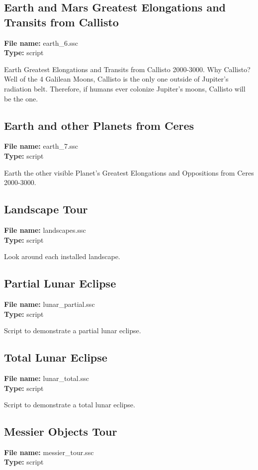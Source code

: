 \subsection{Earth and Mars Greatest Elongations and Transits from Callisto}
\textbf{File name:} earth\_6.ssc \\
\textbf{Type:} script

Earth Greatest Elongations and Transits from Callisto 2000-3000. Why Callisto? Well of the 4 Galilean Moons, Callisto is the only one outside of Jupiter's radiation belt. Therefore, if humans ever colonize Jupiter's moons, Callisto will be the one.

\subsection{Earth and other Planets from Ceres}
\textbf{File name:} earth\_7.ssc \\
\textbf{Type:} script

Earth the other visible Planet's Greatest Elongations and Oppositions from Ceres 2000-3000.

\subsection{Landscape Tour}
\textbf{File name:} landscapes.ssc \\
\textbf{Type:} script

Look around each installed landscape.

\subsection{Partial Lunar Eclipse}
\textbf{File name:} lunar\_partial.ssc \\
\textbf{Type:} script

Script to demonstrate a partial lunar eclipse.

\subsection{Total Lunar Eclipse}
\textbf{File name:} lunar\_total.ssc \\
\textbf{Type:} script

Script to demonstrate a total lunar eclipse.

\subsection{Messier Objects Tour}
\textbf{File name:} messier\_tour.ssc \\
\textbf{Type:} script


